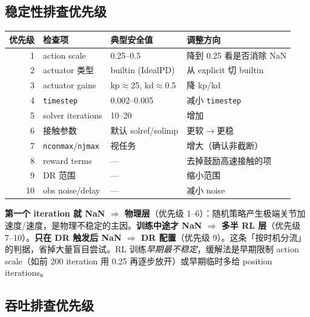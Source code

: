 \subsection{稳定性排查优先级}

\begin{center}
\small
\begin{tabular}{@{}rlll@{}}
\toprule
优先级 & 检查项 & 典型安全值 & 调整方向 \\
\midrule
1 & action scale & 0.25--0.5 & 降到 0.25 看是否消除 NaN \\
2 & actuator 类型 & builtin (IdealPD) & 从 explicit 切 builtin \\
3 & actuator gains & kp$\approx$25, kd$\approx$0.5 & 降 kp/kd \\
4 & \verb|timestep| & 0.002--0.005 & 减小 \verb|timestep| \\
5 & solver iterations & 10--20 & 增加 \\
6 & 接触参数 & 默认 solref/solimp & 更软$\to$更稳 \\
7 & \verb|nconmax|/\verb|njmax| & 视任务 & 增大（确认非截断） \\
8 & reward terms & — & 去掉鼓励高速接触的项 \\
9 & DR 范围 & — & 缩小范围 \\
10 & obs noise/delay & — & 减小 noise \\
\bottomrule
\end{tabular}
\end{center}

\begin{insight}\label{ins:rlmc-phys-nan}
\textbf{第一个 iteration 就 NaN $\Rightarrow$ 物理层}（优先级 1--6）：随机策略产生极端关节加速度/速度，是物理不稳定的主因。\textbf{训练中途才 NaN $\Rightarrow$ 多半 RL 层}（优先级 7--10）。\textbf{只在 DR 触发后 NaN $\Rightarrow$ DR 配置}（优先级 9）。这条「按时机分流」的判据，省掉大量盲目尝试。RL 训练\emph{早期最不稳定}，缓解法是早期限制 action scale（如前 200 iteration 用 0.25 再逐步放开）或早期临时多给 position iterations。
\end{insight}

\subsection{吞吐排查优先级}

